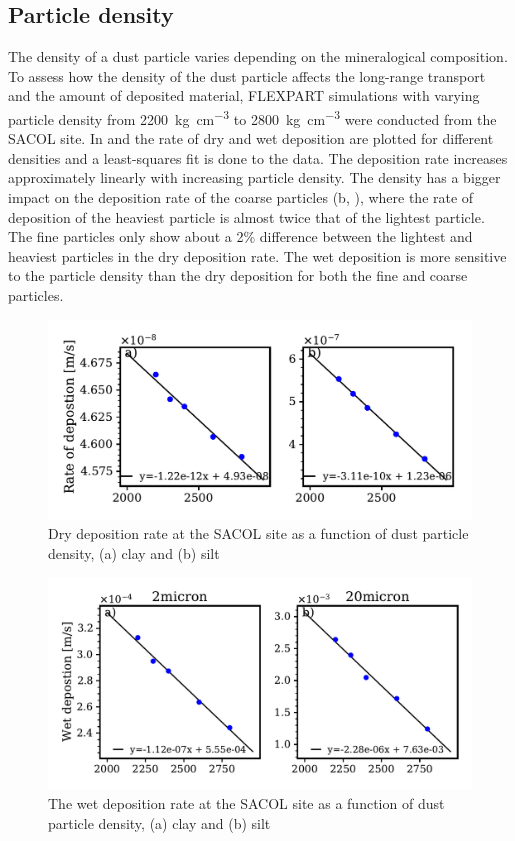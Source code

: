 \subsection{Particle density}\label{sec:density_experiment}
The density of a dust particle varies depending on the mineralogical composition. 
To assess how the density of the dust particle affects the long-range transport and the amount of deposited material,
FLEXPART simulations with varying particle density from \SI{2200}{\kg\per\cubic\cm} to \SI{2800}{\kg\per\cubic\cm}  were conducted from the SACOL site. 
In  and  the rate of dry and wet deposition are plotted for different densities and a least-squares fit is done to the data. 
The deposition rate increases approximately linearly with increasing particle density. 
The density has a bigger impact on the deposition rate of the coarse particles (b, ), where the rate of deposition of the heaviest particle is almost twice that of the lightest particle. 
The fine particles only show about a 2\% difference between the lightest and heaviest particles in the dry deposition rate. 
The wet deposition is more sensitive to the particle density than the dry deposition for both the fine and coarse particles.
\begin{figure}[hptb]
    \centering
    \includegraphics[width=\textwidth]{texfiles/figs/drydep_function_of_density.pdf}
    \caption{Dry deposition rate at the SACOL site as a function of dust particle density, (a) clay and (b) silt}
    \label{fig:dry_dep_density}
\end{figure}

\begin{figure}[hptb]
    \centering
    \includegraphics[width=\textwidth]{texfiles/figs/wetdep_function_of_density.pdf}
    \caption{The wet deposition rate at the SACOL site as a function of dust particle density, (a) clay and (b) silt}
    \label{fig:wet_dep_density}
\end{figure}

